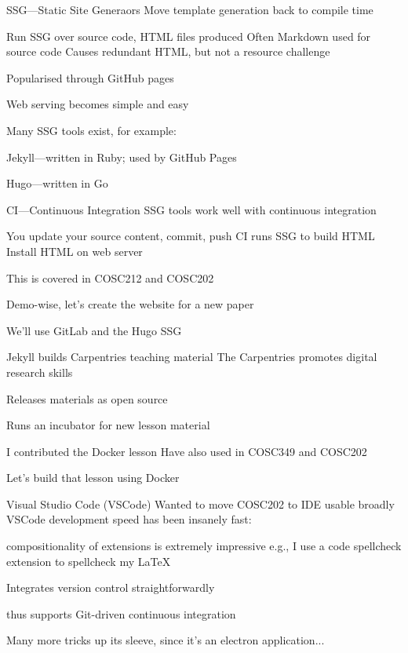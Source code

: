 \documentclass[aspectratio=169,t]{beamer}
\begin{document}
\begin{dframe}{SSG---Static Site Generaors}
  \1 Move template generation back to compile time

  \2 Run SSG over source code, HTML files produced
  \2 Often Markdown used for source code
  \2 Causes redundant HTML, but not a resource challenge

  \1 Popularised through GitHub pages

  \2 Web serving becomes simple and easy


  \1 Many SSG tools exist, for example:

  \2 Jekyll---written in Ruby; used by GitHub Pages

  \2 Hugo---written in Go
\end{dframe}

\begin{dframe}{CI---Continuous Integration}
  \1 SSG tools work well with continuous integration

  \2 You update your source content, commit, push
  \2 CI runs SSG to build HTML
  \2 Install HTML on web server

  \bigskip
  
  \1 This is covered in COSC212 and COSC202
  
  \bigskip

  \1 Demo-wise, let's create the website for a new paper
  
  \2 We'll use GitLab and the Hugo SSG
\end{dframe}

\begin{dframe}{Jekyll builds Carpentries teaching material}
  \1 The Carpentries promotes digital research skills

  \2 Releases materials as open source

  \bigskip
  
  \1 Runs an incubator for new lesson material
  
  \2 I contributed the Docker lesson
  \2 Have also used in COSC349 and COSC202
  
  \bigskip

  \1 Let's build that lesson using Docker
\end{dframe}

\begin{dframe}{Visual Studio Code (VSCode)}
  \1 Wanted to move COSC202 to IDE usable broadly
  \1 VSCode development speed has been insanely fast:
  
  \2 compositionality of extensions is extremely impressive
  \2 e.g., I use a code spellcheck extension to spellcheck my \LaTeX{}

  \1 Integrates version control straightforwardly
  
  \2 thus supports Git-driven continuous integration
  
  \1 Many more tricks up its sleeve, since it's an electron application...
\end{dframe}
\end{document}
